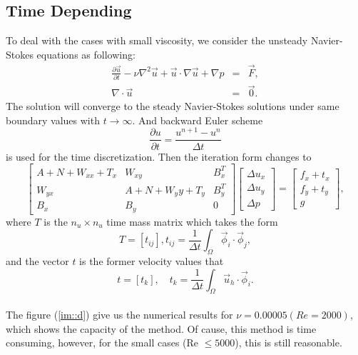 \documentclass[a4paper]{article}
\begin{document}
\subsection{Time Depending}
To deal with the cases with small viscosity, we consider the unsteady Navier-Stokes equations as following: 
\begin{equation}
\begin{array}{rcl}
\frac{\partial \vec{u}}{\partial t} - \nu \nabla^2 \vec{u} + \vec{u} \cdot \nabla \vec{u} + \nabla p & = & \vec{F}, \\
\nabla \cdot \vec{u} & = & \vec{0}.
\label{eq::Timedepending-problem}
\end{array}
\end{equation}
The solution will converge to the steady Navier-Stokes solutions under same boundary values with $t \to \infty$.
And backward Euler scheme
$$
\frac{\partial u}{\partial t} = \frac{u^{n + 1}-u^{n}}{\Delta t}
$$
is used for the time discretization. Then the iteration form changes to
\begin{equation}
\left[ \begin{array}{ccc}
A + N + W_{xx} + T_x & W_{xy} & B_x^T \\
W_{yx} & A + N + W{_yy} + T_y& B_y^T \\
B_x & B_y & 0
\end{array}
\right]
\left[\begin{array}{ccc}
\Delta u_x\\
\Delta u_y\\
\Delta p
\end{array}
\right] =
\left[\begin{array}{ccc}
f_x + t_x\\
f_y + t_y\\
g
\end{array}
\right],
\label{Timedepending}
\end{equation}
where $T$ is the $n_u\times n_u$ time mass matrix which takes the form
\begin{equation}
T = [t_{ij}], t_{ij}=\frac{1}{\Delta t} \int_{\Omega} \vec{\phi}_i
\cdot \vec{\phi}_j,
\end{equation}
and the vector $t$ is the former velocity values that
\begin{equation}
t = [t_{k}],\quad t_{k}=\frac{1}{\Delta t}\int_{\Omega}\vec{u}_h\cdot\vec{\phi}_i.
\end{equation}
\\


The figure (\ref{im::d}) give us the numerical results for
$\nu=0.00005(Re=2000)$, which shows the capacity of the method. Of
cause, this method is time consuming, however, for the small cases (Re
$\leq 5000$), this is still reasonable.
\end{document}
